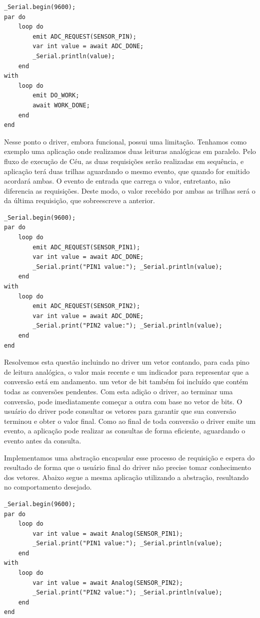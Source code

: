 \documentclass{article}
\begin{document}
\begin{lstlisting}[style=CStyle,label=analogceu,caption=Aplicação utilizando driver em Céu]
_Serial.begin(9600);
par do
    loop do
        emit ADC_REQUEST(SENSOR_PIN);
        var int value = await ADC_DONE;
        _Serial.println(value);
    end
with
    loop do
        emit DO_WORK;
        await WORK_DONE;
    end
end
\end{lstlisting}
\par Nesse ponto o driver, embora funcional, possui uma limitação. Tenhamos como exemplo uma aplicação onde realizamos duas leituras analógicas em paralelo. Pelo fluxo de execução de Céu, as duas requisições serão realizadas em sequência, e aplicação terá duas trilhas aguardando o mesmo evento, que quando for emitido acordará ambas. O evento de entrada que carrega o valor, entretanto, não diferencia as requisições. Deste modo, o valor recebido por ambas as trilhas será o da última requisição, que sobreescreve a anterior.
\begin{lstlisting}[style=CStyle,label=analogceutwo1,caption=Aplicação utilizando driver em Céu]
_Serial.begin(9600);
par do
    loop do
        emit ADC_REQUEST(SENSOR_PIN1);
        var int value = await ADC_DONE;
        _Serial.print("PIN1 value:"); _Serial.println(value);
    end
with
    loop do
        emit ADC_REQUEST(SENSOR_PIN2);
        var int value = await ADC_DONE;
        _Serial.print("PIN2 value:"); _Serial.println(value);
    end
end
\end{lstlisting}
\par Resolvemos esta questão incluindo no driver um vetor contando, para cada pino de leitura analógica, o valor mais recente e um indicador para representar que a conversão está em andamento. um vetor de bit também foi incluído que contém todas as conversões pendentes. Com esta adição o driver, ao terminar uma conversão, pode imediatamente começar a outra com base no vetor de bits. O usuário do driver pode consultar os vetores para garantir que sua conversão terminou e obter o valor final. Como ao final de toda conversão o driver emite um evento, a aplicação pode realizar as consultas de forma eficiente, aguardando o evento antes da consulta. 
\par Implementamos uma abstração encapsular esse processo de requisição e espera do resultado de forma que o usuário final do driver não precise tomar conhecimento dos vetores. Abaixo segue a mesma aplicação utilizando a abstração, resultando no comportamento desejado.
\begin{lstlisting}[style=CStyle,label=analogceutwo1,caption=Aplicação utilizando driver em Céu]
_Serial.begin(9600);
par do
    loop do
        var int value = await Analog(SENSOR_PIN1);
        _Serial.print("PIN1 value:"); _Serial.println(value);
    end
with
    loop do
        var int value = await Analog(SENSOR_PIN2);
        _Serial.print("PIN2 value:"); _Serial.println(value);
    end
end
\end{lstlisting}
\end{document}
